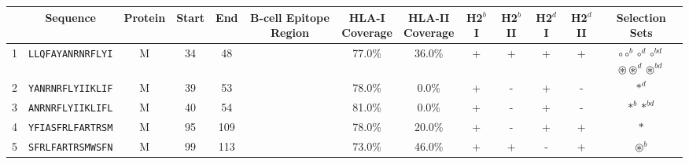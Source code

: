 \begin{tabular}{rcccccccccccc}
\toprule
{} &                  Sequence & Protein &  Start &   End &                                            B-cell Epitope Region & \Centerstack{HLA-I \\ Coverage} & \Centerstack{HLA-II \\ Coverage} & H2$^{b}$ I & H2$^{b}$ II & H2$^{d}$ I & H2$^{d}$ II &                                                                                                                        Selection Sets \\
\midrule
1  &  \texttt{LLQFAYANRNRFLYI} &       M &     34 &    48 &                                                                  &                          77.0\% &                           36.0\% &          + &           + &          + &           + &                                  \Centerstack{  $\circ \circ^b \circ^d \circ^{bd}$ \\  $\circledast \circledast^d \circledast^{bd}$ } \\
2  &  \texttt{YANRNRFLYIIKLIF} &       M &     39 &    53 &                                                                  &                          78.0\% &                            0.0\% &          + &           - &          + &           - &                                                                                                                            $ \ast^d $ \\
3  &  \texttt{ANRNRFLYIIKLIFL} &       M &     40 &    54 &                                                                  &                          81.0\% &                            0.0\% &          + &           - &          + &           - &                                                                                                                  $ \ast^b \ast^{bd} $ \\
4  &  \texttt{YFIASFRLFARTRSM} &       M &     95 &   109 &                                                                  &                          78.0\% &                           20.0\% &          + &           - &          + &           + &                                                                                                                              $ \ast $ \\
5  &  \texttt{SFRLFARTRSMWSFN} &       M &     99 &   113 &                                                                  &                          73.0\% &                           46.0\% &          + &           + &          - &           + &                                                                                                                     $ \circledast^b $ \\

\end{tabular}
